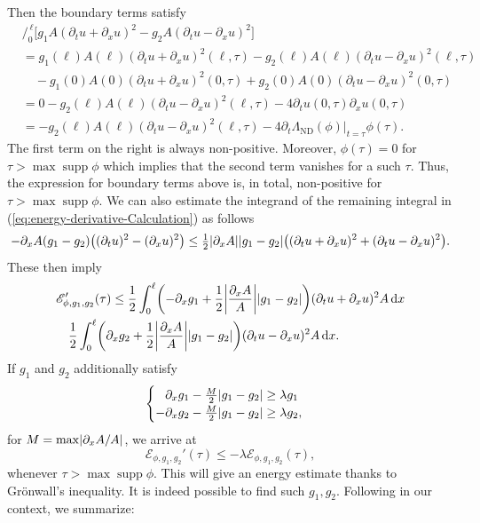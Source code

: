 \documentclass[10pt,a4paper]{article}
\theoremstyle{plain}
\theoremstyle{definition}
\theoremstyle{remark}
\numberwithin{equation}{section}
\DeclarePairedDelimiter\parentheses{\lparen}{\rparen} %
\DeclarePairedDelimiter\abs{\lvert}{\rvert} %
\newcommand{\supp}{\operatorname{supp}}
\newcommand{\intlim}[2]{\bigg/_{\!\!\!\! #1}^{\, #2}}
\newcommand{\dx}{\,\mathrm{d}x}
\newcommand{\ND}{\Lambda_{\text{ND}}}
\begin{document}
Then the {boundary terms} satisfy
\begin{align*}
  &\intlim{0}{\ell} \Big[ g_1 A (\partial_t u + \partial_x u)^2 - g_2 A (\partial_t u - \partial_x u)^2 \Big] \\
  &= g_1(\ell) A(\ell) (\partial_t u + \partial_x u)^2(\ell,\tau) - g_2(\ell) A(\ell) (\partial_t u - \partial_x u)^2(\ell,\tau) \\
  &\quad - g_1(0) A(0) (\partial_t u + \partial_x u)^2(0,\tau) + g_2(0) A(0) (\partial_t u - \partial_x u)^2(0,\tau) \\
  &= 0 - g_2(\ell) A(\ell) (\partial_t u - \partial_x u)^2(\ell,\tau)-   4 \partial_t u(0,\tau) \partial_x u(0,\tau) \\
  &= - g_2(\ell) A(\ell) (\partial_t u - \partial_x u)^2(\ell,\tau) - 4 \partial_t  \ND ( \phi) |_{t= \tau} \phi (\tau) .
\end{align*}
The first term on the right is always non-positive. Moreover, $\phi (\tau) = 0$ for $\tau > \max \supp \phi $ which implies that the second term vanishes for a such $\tau$. Thus, the {expression for boundary terms} above is, { in total,} non-positive for $\tau > \max \supp \phi $. 
We can also estimate the integrand of the remaining integral in (\ref{eq:energy-derivative-Calculation}) as follows
\[
  - \partial_x A (g_1 - g_2) \big((\partial_t u)^2 - (\partial_x u)^2\big) \leq \tfrac{1}{2} \abs{\partial_x A} \abs{g_1 - g_2} \big((\partial_t u + \partial_x u)^2 + (\partial_t u - \partial_x u)^2\big). 
\]
These then imply 
\begin{align*}
  &\mathscr{E}_{\phi, g_1,g_2}'(\tau) 
   \leq \frac{1}{2} \int_0^\ell \parentheses*{-\partial_x g_1 + \frac{1}{2} \abs*{\frac{\partial_x A}{A}} \abs{g_1 - g_2}} (\partial_t u + \partial_x u)^2 A \dx \\
  &\quad \frac{1}{2} \int_0^\ell \parentheses*{\partial_x g_2 + \frac{1}{2} \abs*{\frac{\partial_x A}{A}} \abs{g_1 - g_2}} (\partial_t u - \partial_x u)^2 A \dx.
\end{align*}
If $g_1$ and $g_2$ additionally satisfy
\begin{equation}
  \label{eq:energy-coefficient-inequalities}
  \begin{cases}
    \phantom{-} \partial_x g_1 - \tfrac{M}{2} \abs{g_1 - g_2} \geq \lambda g_1 \\
    - \partial_x g_2 - \tfrac{M}{2} \abs{g_1 - g_2} \geq \lambda g_2 ,
  \end{cases}
\end{equation}
for  $M = \max \abs{\partial_x A / A}$,  we arrive at
\begin{equation}
  \label{eq:energy-derivative-estimate}
  \mathscr{E}_{\phi ,g_1, g_2}'(\tau) \leq - \lambda  \mathscr{E}_{\phi,g_1,g_2}(\tau),
\end{equation}
whenever $\tau > \max \supp \phi$. This will give an energy estimate thanks to Gr\"onwall's inequality. 
It is indeed possible to find such $g_1,g_2$. Following \cite{arnold22_expon_time_decay_one_dimen} in our context, we summarize:
\end{document}
